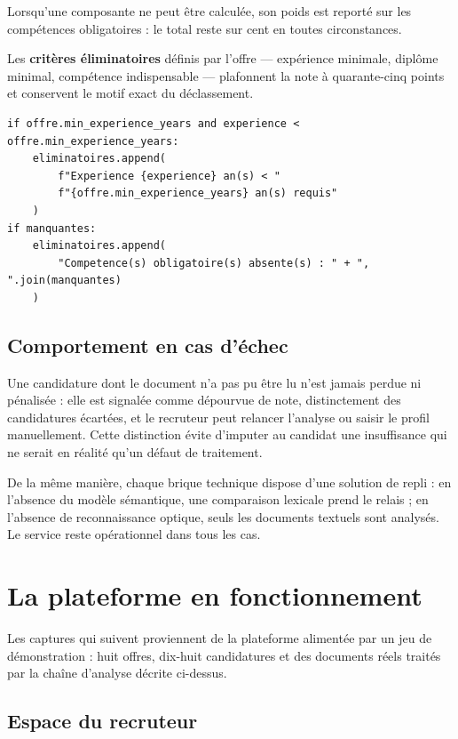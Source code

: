 \documentclass[11pt,a4paper]{article}
\begin{document}
\vspace{2mm}
\noindent Lorsqu'une composante ne peut être calculée, son poids est reporté sur les compétences obligatoires : le total reste sur cent en toutes circonstances.

Les \textbf{critères éliminatoires} définis par l'offre — expérience minimale, diplôme minimal, compétence indispensable — plafonnent la note à quarante-cinq points et conservent le motif exact du déclassement.

\begin{lstlisting}[caption={Traçage du motif : condition de l'explicabilité de la note.}]
if offre.min_experience_years and experience < offre.min_experience_years:
    eliminatoires.append(
        f"Experience {experience} an(s) < "
        f"{offre.min_experience_years} an(s) requis"
    )
if manquantes:
    eliminatoires.append(
        "Competence(s) obligatoire(s) absente(s) : " + ", ".join(manquantes)
    )
\end{lstlisting}

\subsection{Comportement en cas d'échec}
Une candidature dont le document n'a pas pu être lu n'est jamais perdue ni pénalisée : elle est signalée comme dépourvue de note, distinctement des candidatures écartées, et le recruteur peut relancer l'analyse ou saisir le profil manuellement. Cette distinction évite d'imputer au candidat une insuffisance qui ne serait en réalité qu'un défaut de traitement.

De la même manière, chaque brique technique dispose d'une solution de repli : en l'absence du modèle sémantique, une comparaison lexicale prend le relais ; en l'absence de reconnaissance optique, seuls les documents textuels sont analysés. Le service reste opérationnel dans tous les cas.

\section{La plateforme en fonctionnement}
Les captures qui suivent proviennent de la plateforme alimentée par un jeu de démonstration : huit offres, dix-huit candidatures et des documents réels traités par la chaîne d'analyse décrite ci-dessus.

\subsection{Espace du recruteur}
\end{document}
